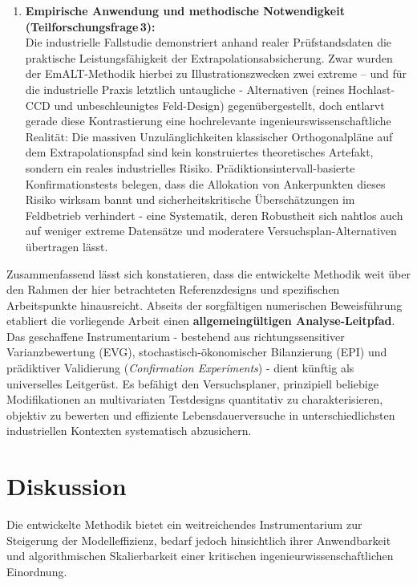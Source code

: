 \begin{enumerate}
      \item \textbf{Empirische Anwendung und methodische Notwendigkeit (Teilforschungsfrage\,3):} \\
            Die industrielle Fallstudie demonstriert anhand realer Prüfstandsdaten die praktische Leistungsfähigkeit der Extrapolationsabsicherung.
            Zwar wurden der \ac{EmALT}-Methodik hierbei zu Illustrationszwecken zwei extreme -- und für die industrielle Praxis letztlich untaugliche - Alternativen (reines Hochlast-\ac{CCD} und unbeschleunigtes Feld-Design) gegenübergestellt, doch entlarvt gerade diese Kontrastierung eine hochrelevante ingenieurswissenschaftliche Realität:
            Die massiven Unzulänglichkeiten klassischer Orthogonalpläne auf dem Extrapolationspfad sind kein konstruiertes theoretisches Artefakt, sondern ein reales industrielles Risiko.
            Prädiktionsintervall-basierte Konfirmationstests belegen, dass die Allokation von Ankerpunkten dieses Risiko wirksam bannt und sicherheitskritische Überschätzungen im Feldbetrieb verhindert - eine Systematik, deren Robustheit sich nahtlos auch auf weniger extreme Datensätze und moderatere Versuchsplan-Alternativen übertragen lässt.
\end{enumerate}

Zusammenfassend lässt sich konstatieren, dass die entwickelte Methodik weit über den Rahmen der hier betrachteten Referenzdesigns und spezifischen Arbeitspunkte hinausreicht.
Abseits der sorgfältigen numerischen Beweisführung etabliert die vorliegende Arbeit einen \textbf{allgemeingültigen Analyse-Leitpfad}.
Das geschaffene Instrumentarium - bestehend aus richtungssensitiver Varianzbewertung (\ac{EVG}), stochastisch-ökonomischer Bilanzierung (\ac{EPI}) und prädiktiver Validierung (\textit{Confirmation Experiments}) - dient künftig als universelles Leitgerüst.
Es befähigt den Versuchsplaner, prinzipiell beliebige Modifikationen an multivariaten Testdesigns quantitativ zu charakterisieren, objektiv zu bewerten und effiziente Lebensdauerversuche in unterschiedlichsten industriellen Kontexten systematisch abzusichern.

\section{Diskussion} \label{sec:fazit_diskussion}

Die entwickelte Methodik bietet ein weitreichendes Instrumentarium zur Steigerung der Modelleffizienz, bedarf jedoch hinsichtlich ihrer Anwendbarkeit und algorithmischen Skalierbarkeit einer kritischen ingenieurwissenschaftlichen Einordnung.

